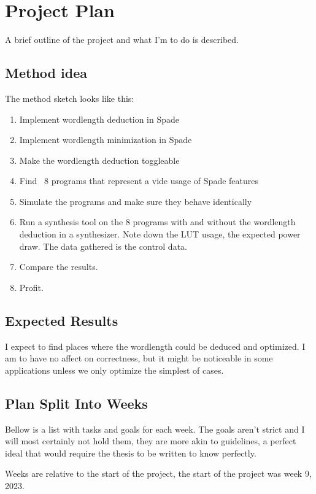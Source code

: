 \documentclass[msc,lith,english]{liuthesis}
\begin{document}
\chapter{Project Plan}
A brief outline of the project and what I'm to do is described.

\section{Method idea}
The method sketch looks like this:
\begin{enumerate}
  \item Implement wordlength deduction in Spade
  \item Implement wordlength minimization in Spade
  \item Make the wordlength deduction toggleable
  \item Find ~8 programs that represent a vide usage of Spade features
  \item Simulate the programs and make sure they behave identically
  \item Run a synthesis tool on the 8 programs with and without the wordlength deduction in a synthesizer. Note down the LUT usage, the expected power draw. The data gathered is the control data.
  \item Compare the results.
  \item Profit.
\end{enumerate}

\section{Expected Results}
I expect to find places where the wordlength could be deduced and optimized. I am to have no affect on correctness, but it might be noticeable in some applications unless we only optimize the simplest of cases.

\newpage
\section{Plan Split Into Weeks}
Bellow is a list with tasks and goals for each week. The goals aren't strict and I will most certainly not hold them, they are more akin to guidelines, a perfect ideal that would require the thesis to be written to know perfectly. 

Weeks are relative to the start of the project, the start of the project was week 9, 2023.
\end{document}
